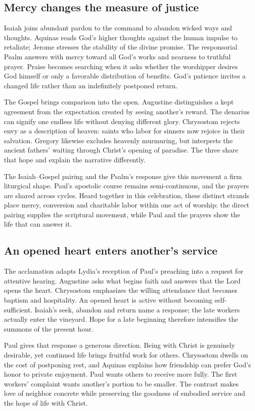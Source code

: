 \subsection*{Mercy changes the measure of justice}
Isaiah joins abundant pardon to the command to abandon wicked ways and
thoughts. Aquinas reads God's higher thoughts against the human impulse to
retaliate; Jerome stresses the stability of the divine promise. The
responsorial Psalm answers with mercy toward all God's works and nearness to
truthful prayer. Praise becomes searching when it asks whether the worshipper
desires God himself or only a favorable distribution of benefits. God's
patience invites a changed life rather than an indefinitely postponed return.

The Gospel brings comparison into the open. Augustine distinguishes a kept
agreement from the expectation created by seeing another's reward. The
denarius can signify one endless life without denying different glory.
Chrysostom rejects envy as a description of heaven: saints who labor for
sinners now rejoice in their salvation. Gregory likewise excludes heavenly
murmuring, but interprets the ancient fathers' waiting through Christ's
opening of paradise. The three share that hope and explain the narrative differently.

The Isaiah--Gospel pairing and the Psalm's response give this movement a firm
liturgical shape. Paul's apostolic course remains semi-continuous, and the
prayers are shared across cycles. Heard together in this celebration, these
distinct strands place mercy, conversion and charitable labor within one act
of worship: the direct pairing supplies the scriptural movement, while Paul
and the prayers show the life that can answer it.

\clearpage
\subsection*{An opened heart enters another's service}
The acclamation adapts Lydia's reception of Paul's preaching into a request
for attentive hearing. Augustine asks what begins faith and answers that the
Lord opens the heart. Chrysostom emphasizes the willing attendance that
becomes baptism and hospitality. An opened heart is active without becoming
self-sufficient. Isaiah's seek, abandon and return name a response; the late
workers actually enter the vineyard. Hope for a late beginning therefore
intensifies the summons of the present hour.

Paul gives that response a generous direction. Being with Christ is genuinely
desirable, yet continued life brings fruitful work for others. Chrysostom
dwells on the cost of postponing rest, and Aquinas explains how friendship can
prefer God's honor to private enjoyment. Paul wants others to receive more
fully. The first workers' complaint wants another's portion to be smaller. The
contrast makes love of neighbor concrete while preserving the goodness of
embodied service and the hope of life with Christ.

